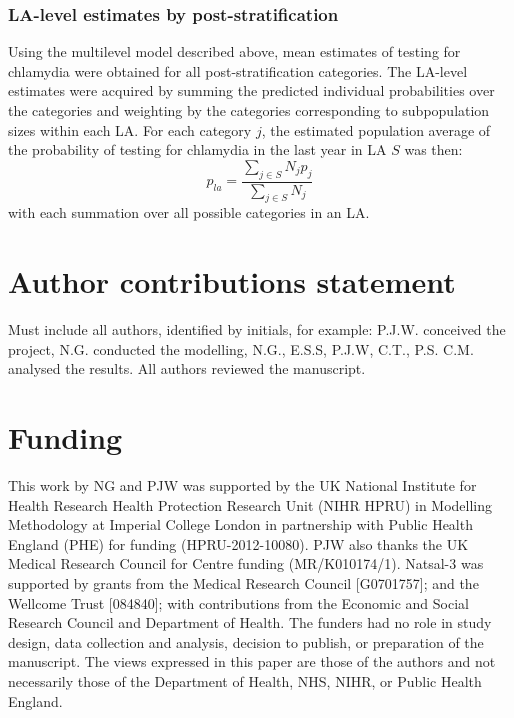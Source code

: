 \documentclass[fleqn,10pt]{wlscirep}
\begin{document}
\subsubsection*{LA-level estimates by post-stratification}
Using the multilevel model described above, mean estimates of testing for chlamydia were obtained for all post-stratification categories. The LA-level estimates were acquired by summing the predicted individual probabilities over the categories and weighting by the categories corresponding to subpopulation sizes within each LA.
For each category $j$, the estimated population average of the probability of testing for chlamydia in the last year in LA $S$ was then:
\begin{displaymath}
p_{la} = \frac{\sum_{j\in S} N_j p_j}{\sum_{j\in S} N_j}
\end{displaymath}
with each summation over all possible categories in an LA.




\section*{Author contributions statement}

Must include all authors, identified by initials, for example:
P.J.W. conceived the project,  N.G. conducted the modelling, N.G., E.S.S, P.J.W, C.T., P.S. C.M. analysed the results.  All authors reviewed the manuscript. 

\section*{Funding}
This work by NG and PJW was supported by the UK National Institute for Health Research Health Protection Research Unit (NIHR HPRU) in Modelling Methodology at Imperial College London in partnership with Public Health England (PHE) for funding (HPRU-2012-10080). PJW also thanks the UK Medical Research Council for Centre funding (MR/K010174/1). Natsal-3 was supported by grants from the Medical Research Council [G0701757]; and the Wellcome Trust [084840]; with contributions from the Economic and Social Research Council and Department of Health.
The funders had no role in study design, data collection and analysis, decision to publish, or preparation of the manuscript. The views expressed in this paper are those of the authors and not necessarily those of the Department of Health, NHS, NIHR, or Public Health England. 

\end{document}
